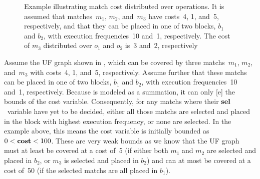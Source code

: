 \begin{figure}
  \caption[Example illustrating match cost distributed over operations]%
          {%
            Example illustrating match cost distributed over operations.
            It is assumed that matches~$m_1$, $m_2$, and~$m_3$ have
            costs~\num{4}, \num{1}, and~\num{5}, respectively, and that they can
            be placed in one of two blocks, $b_1$ and $b_2$, with execution
            frequencies~\num{10} and~\num{1}, respectively.
            The cost of $m_3$ distributed over $o_1$ and $o_2$ is~\num{3}
            and~\num{2}, respectively%
          }
\end{figure}
%
Assume the \gls{UF graph} shown in , which can be
covered by three \glspl{match}~$m_1$, $m_2$, and~$m_3$ with costs~\num{4},
\num{1}, and~\num{5}, respectively.
%
Assume further that these \glspl{match} can be placed in one of two blocks,
$b_1$ and $b_2$, with execution frequencies~\num{10} and~\num{1}, respectively.
%
Because  is modeled as a summation, it can
only [e] the bounds of the \gls{cost variable}.
%
Consequently, for any \glspl{match} where their $\mVar{sel}$~\gls{variable} have
yet to be decided, either all those \glspl{match} are selected and placed in the
\gls{block} with highest execution frequency, or none are selected.
%
In the example above, this means the \gls{cost variable} is initially bounded as
\mbox{$0 < \mVar{cost} < 100$}.
%
These are very weak bounds as we know that the \gls{UF graph} must at least be
covered at a cost of~\num{5} (if either both $m_1$ and $m_2$ are selected and
placed in $b_2$, or $m_3$ is selected and placed in $b_2$) and can at most be
covered at a cost of~\num{50} (if the selected \glspl{match} are all placed in
$b_1$).

